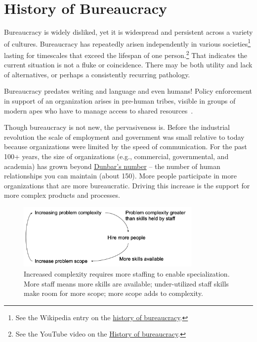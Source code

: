 \section{History of Bureaucracy\label{sec:history}}

Bureaucracy is widely disliked, yet it is widespread and persistent across a variety of cultures. 
Bureaucracy has repeatedly arisen independently in various societies\footnote{See the Wikipedia entry on the \href{https://en.wikipedia.org/wiki/Bureaucracy\%23History}{history of bureaucracy}.%
}
lasting for timescales that exceed the lifespan of one person.\footnote{See the YouTube video on the \href{https://www.youtube.com/watch?v=B_nsZlcC12g}{History of bureaucracy}.} That indicates the current situation is not a fluke or coincidence. There may be both utility and lack of alternatives, or perhaps a consistently recurring pathology. 


Bureaucracy predates writing and language and even humans! Policy enforcement in support of an organization arises in pre-human tribes, visible in groups of modern apes who have to manage access to shared resources~\cite{2016_Suchak}. 



Though bureaucracy is not new, the pervasiveness is. Before the industrial revolution the scale of employment and government was small relative to today because organizations were limited by the speed of communication. For the past 100+ years, the size of organizations (e.g., commercial, governmental, and academia) has grown beyond \href{https://en.wikipedia.org/wiki/Dunbar\%27s_number}{Dunbar's number} -- the number of human relationships you can maintain (about 150). \iftoggle{WPinmargin}{\marginpar{$>$Wikipedia: Dunbar's number}}{}
More people participate in more organizations that are more bureaucratic. Driving this increase is the support for more complex products and processes. 

\begin{center}
\begin{figure}[ht]
    \centering
    \includegraphics[width=0.8\textwidth]{images/feedback_loop_complexity_and_staffing}
    \caption{Increased complexity requires more staffing to enable specialization. More staff means more skills are available; under-utilized staff skills make room for more scope; more scope adds to complexity.}
    \label{fig:complexity_and_staff_growth}
\end{figure}
\end{center}


